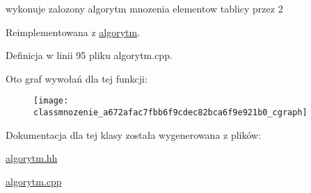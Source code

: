 wykonuje zalozony algorytm mnozenia elementow tablicy przez 2 



\-Reimplementowana z \hyperlink{classalgorytm_af3f92bf537b1f2e1f93173983e838449}{algorytm}.



\-Definicja w linii 95 pliku algorytm.\-cpp.



\-Oto graf wywołań dla tej funkcji\-:\nopagebreak
\begin{figure}[H]
\begin{center}
\leavevmode
\texttt{[image: classmnozenie\_a672afac7fbb6f9cdec82bca6f9e921b0\_cgraph]}
\end{center}
\end{figure}




\-Dokumentacja dla tej klasy została wygenerowana z plików\-:\begin{DoxyCompactItemize}
\item 
\hyperlink{algorytm_8hh}{algorytm.\-hh}\item 
\hyperlink{algorytm_8cpp}{algorytm.\-cpp}\end{DoxyCompactItemize}
